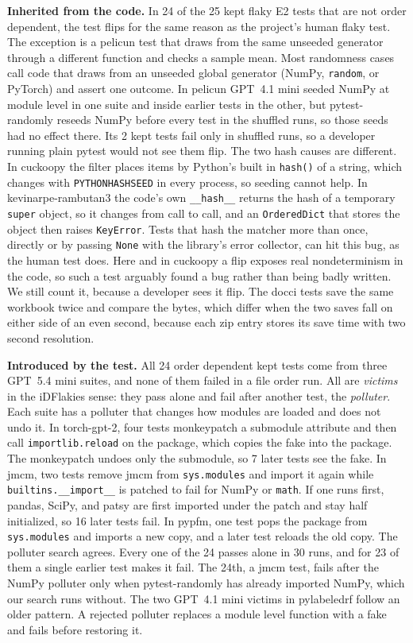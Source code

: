 \documentclass[sigconf,nonacm]{acmart}
\begin{document}
\textbf{Inherited from the code.} In 24 of the 25 kept flaky E2 tests that are not order dependent, the test flips for the same reason as the project's human flaky test. The exception is a pelicun test that draws from the same unseeded generator through a different function and checks a sample mean. Most randomness cases call code that draws from an unseeded global generator (NumPy, \texttt{random}, or PyTorch) and assert one outcome. In pelicun GPT~4.1 mini seeded NumPy at module level in one suite and inside earlier tests in the other, but pytest-randomly reseeds NumPy before every test in the shuffled runs, so those seeds had no effect there. Its 2 kept tests fail only in shuffled runs, so a developer running plain pytest would not see them flip. The two hash causes are different. In cuckoopy the filter places items by Python's built in \texttt{hash()} of a string, which changes with \texttt{PYTHONHASHSEED} in every process, so seeding cannot help. In kevinarpe-rambutan3 the code's own \texttt{\_\_hash\_\_} returns the hash of a temporary \texttt{super} object, so it changes from call to call, and an \texttt{OrderedDict} that stores the object then raises \texttt{KeyError}. Tests that hash the matcher more than once, directly or by passing \texttt{None} with the library's error collector, can hit this bug, as the human test does. Here and in cuckoopy a flip exposes real nondeterminism in the code, so such a test arguably found a bug rather than being badly written. We still count it, because a developer sees it flip. The docci tests save the same workbook twice and compare the bytes, which differ when the two saves fall on either side of an even second, because each zip entry stores its save time with two second resolution.

\textbf{Introduced by the test.} All 24 order dependent kept tests come from three GPT~5.4 mini suites, and none of them failed in a file order run. All are \emph{victims} in the iDFlakies sense: they pass alone and fail after another test, the \emph{polluter}. Each suite has a polluter that changes how modules are loaded and does not undo it. In torch-gpt-2, four tests monkeypatch a submodule attribute and then call \texttt{importlib.reload} on the package, which copies the fake into the package. The monkeypatch undoes only the submodule, so 7 later tests see the fake. In jmcm, two tests remove jmcm from \texttt{sys.modules} and import it again while \texttt{builtins.\_\_import\_\_} is patched to fail for NumPy or \texttt{math}. If one runs first, pandas, SciPy, and patsy are first imported under the patch and stay half initialized, so 16 later tests fail. In pypfm, one test pops the package from \texttt{sys.modules} and imports a new copy, and a later test reloads the old copy. The polluter search agrees. Every one of the 24 passes alone in 30 runs, and for 23 of them a single earlier test makes it fail. The 24th, a jmcm test, fails after the NumPy polluter only when pytest-randomly has already imported NumPy, which our search runs without. The two GPT~4.1 mini victims in pylabeledrf follow an older pattern. A rejected polluter replaces a module level function with a fake and fails before restoring it.
\end{document}
